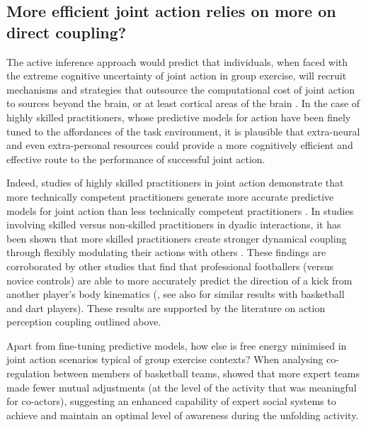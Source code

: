 \begin{CJK}{UTF8}{gbsn}
\subsection{More efficient joint action relies on more on direct coupling?}

The active inference approach would predict that individuals, when faced with the extreme cognitive uncertainty of joint action in group exercise, will recruit mechanisms and strategies that outsource the computational cost of joint action to sources beyond the brain, or at least cortical areas of the brain \citep{Dietrich2004,Clark2015}.  In the case of highly skilled practitioners, whose predictive models for action have been finely tuned to the affordances of the task environment, it is plausible that extra-neural and even extra-personal resources could provide a more cognitively efficient and effective route to the performance of successful joint action.

Indeed, studies of highly skilled practitioners in joint action demonstrate that more technically competent practitioners generate more accurate predictive models for joint action than less technically competent practitioners \citep{Tomeo2012,Aglioti2008,Mulligan2016}.   In studies involving skilled versus non-skilled practitioners in dyadic interactions, it has been shown that more skilled practitioners create stronger dynamical coupling through flexibly modulating their actions with others \citep{Schmidt2011,Caron2017}. These findings are corroborated by other studies that find that professional footballers (versus novice controls) are able to more accurately predict the direction of a kick from another player's body kinematics (\cite{Tomeo2012}, see also \cite{Aglioti2008,Mulligan2016} for similar results with basketball and dart players).  These results are supported by the literature on action perception coupling outlined above.

Apart from fine-tuning predictive models, how else is free energy minimised in joint action scenarios typical of group exercise contexts?  When analysing co-regulation between members of basketball teams, \textcite{Bourbousson2015} showed that more expert teams made fewer mutual adjustments (at the level of the activity that was meaningful for co-actors), suggesting an enhanced capability of expert social systems to achieve and maintain an optimal level of awareness during the unfolding activity.


\end{CJK}
